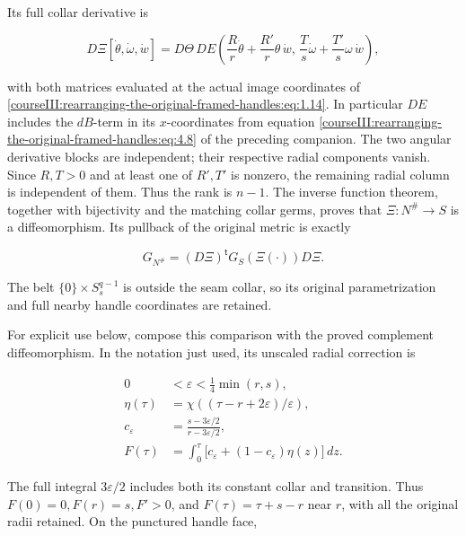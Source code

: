 Its full collar derivative is

\begin{equation}
D\Xi[\dot\theta,\dot\omega,\dot w]
=D\Theta\,DE
\left(
 \frac Rr\dot\theta+\frac{R'}r\theta\,\dot w,\,
 \frac Ts\dot\omega+\frac{T'}s\omega\,\dot w
\right),
\label{courseIII:rearranging-the-original-framed-handles:eq:1.15}
\end{equation}

with both matrices evaluated at the actual image coordinates of \eqref{courseIII:rearranging-the-original-framed-handles:eq:1.14}. In particular \(DE\) includes the \(dB\)-term in its \(x\)-coordinates from equation \eqref{courseIII:rearranging-the-original-framed-handles:eq:4.8} of the preceding companion. The two angular derivative blocks are independent; their respective radial components vanish. Since \(R,T>0\) and at least one of \(R',T'\) is nonzero, the remaining radial column is independent of them. Thus the rank is \(n-1\). The inverse function theorem, together with bijectivity and the matching collar germs, proves that \(\Xi:N^\#\to S\) is a diffeomorphism. Its pullback of the original metric is exactly

\begin{equation}
G_{N^\#}=(D\Xi)^{\mathsf t}G_S(\Xi(\cdot))D\Xi.
\label{courseIII:rearranging-the-original-framed-handles:eq:1.16}
\end{equation}

The belt \(\{0\}\times S_s^{q-1}\) is outside the seam collar, so its original parametrization and full nearby handle coordinates are retained.

For explicit use below, compose this comparison with the proved complement diffeomorphism. In the notation just used, its unscaled radial correction is

\begin{equation}
\begin{aligned}
0&<\varepsilon<\tfrac14\min(r,s),\\
\eta(\tau)&=\chi((\tau-r+2\varepsilon)/\varepsilon),\\
c_\varepsilon&=\frac{s-3\varepsilon/2}{r-3\varepsilon/2},\\
F(\tau)&=\int_0^\tau
 \bigl[c_\varepsilon+(1-c_\varepsilon)\eta(z)\bigr]\,dz.
\end{aligned}
\label{courseIII:rearranging-the-original-framed-handles:eq:1.17}
\end{equation}

The full integral \(3\varepsilon/2\) includes both its constant collar and transition. Thus \(F(0)=0,F(r)=s,F'>0\), and \(F(\tau)=\tau+s-r\) near \(r\), with all the original radii retained. On the punctured handle face,

